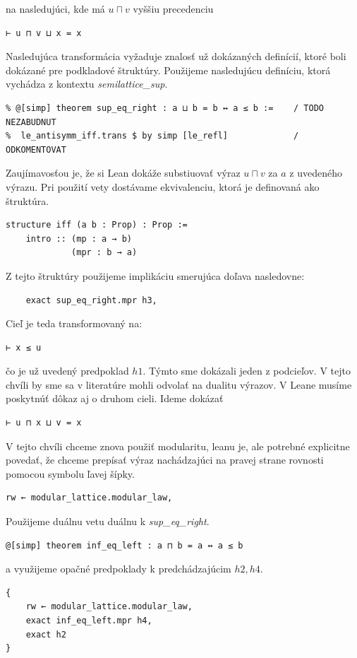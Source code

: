 \documentclass[a4paper,10pt,oneside]{report}%
\begin{document}
na nasledujúci, kde má $u \sqcap v$ vyššiu precedenciu
\begin{lstlisting}
⊢ u ⊓ v ⊔ x = x
\end{lstlisting}
    Nasledujúca transformácia vyžaduje znalosť už dokázaných definícií, ktoré
boli dokázané pre podkladové štruktúry. Použijeme nasledujúcu definíciu, ktorá vychádza
z kontextu \emph{semilattice\_sup}.
\begin{lstlisting}
% @[simp] theorem sup_eq_right : a ⊔ b = b ↔ a ≤ b :=    / TODO NEZABUDNUT
%  le_antisymm_iff.trans $ by simp [le_refl]             / ODKOMENTOVAT
    \end{lstlisting}
    Zaujímavosťou je, že si Lean dokáže substiuovať výraz $u \sqcap v$ za $a$ z uvedeného
výrazu. Pri použití vety dostávame ekvivalenciu, ktorá je definovaná ako štruktúra.
\begin{lstlisting}
structure iff (a b : Prop) : Prop :=
    intro :: (mp : a → b)
             (mpr : b → a)
\end{lstlisting}
Z tejto štruktúry použijeme implikáciu smerujúca doľava nasledovne:
\begin{lstlisting}
    exact sup_eq_right.mpr h3,
\end{lstlisting}
    Cieľ je teda transformovaný na:
\begin{lstlisting}
⊢ x ≤ u
\end{lstlisting}
čo je už uvedený predpoklad $h1$. Týmto sme dokázali jeden z podcieľov.
    V tejto chvíli by sme sa v literatúre mohli odvolať na dualitu výrazov.
    V Leane musíme poskytnúť dôkaz aj o druhom cieli. Ideme dokázať
\begin{lstlisting}
⊢ u ⊓ x ⊔ v = x
\end{lstlisting}
V tejto chvíli chceme znova použiť modularitu, leanu je, ale potrebné explicitne povedať,
    že chceme prepísať výraz nachádzajúci na pravej strane rovnosti pomocou symbolu
ľavej šípky.
\begin{lstlisting}
rw ← modular_lattice.modular_law,
\end{lstlisting}
    Použijeme duálnu vetu
    duálnu k \emph{sup\_eq\_right}.
\begin{lstlisting}
@[simp] theorem inf_eq_left : a ⊓ b = a ↔ a ≤ b
\end{lstlisting}
    a využijeme opačné predpoklady k predchádzajúcim $h2, h4$.
\begin{lstlisting}
{
    rw ← modular_lattice.modular_law,
    exact inf_eq_left.mpr h4,
    exact h2
}
\end{lstlisting}
\end{document}
